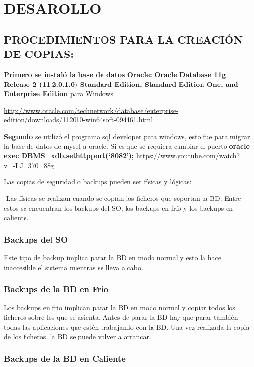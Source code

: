 \chapter{DESAROLLO}

\section{PROCEDIMIENTOS PARA LA CREACIÓN DE COPIAS:}
\textbf {Primero se instaló la base de datos Oracle: Oracle Database 11g Release 2 (11.2.0.1.0) Standard Edition, Standard Edition One, and Enterprise Edition} para Windows

\url{http://www.oracle.com/technetwork/database/enterprise-edition/downloads/112010-win64soft-094461.html}

\textbf{Segundo} se utilizó el programa   sql developer para windows, esto fue para migrar la base de datos de mysql a oracle.
Si es que se requiera cambiar el puerto \textbf { oracle exec DBMS\_xdb.sethttpport(‘8082’);}
\url{https://www.youtube.com/watch?v=-LJ_370_88g}

Las copias de seguridad o backups pueden ser físicas y lógicas:

-Las físicas se realizan cuando se copian los ficheros que soportan la BD. Entre estos se encuentran los backups del SO, los backups en frío y los backups en caliente.

\subsection{Backups del SO}

Este tipo de backup implica parar la BD en modo normal y esto la hace inaccesible el sistema mientras se lleva a cabo.


\subsection{Backups de la BD en Frio}

Los backups en frio implican parar la BD en modo normal y copiar todos los ficheros sobre los que se asienta. Antes de parar la BD hay que parar también todas las aplicaciones que estén trabajando con la BD. Una vez realizada la copia de los ficheros, la BD se puede volver a arrancar.


\subsection{Backups de la BD en Caliente}

